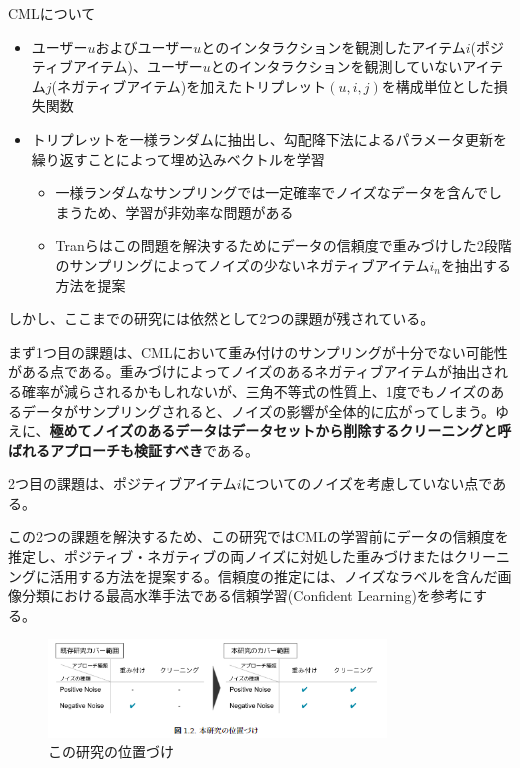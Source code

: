 \documentclass[11pt,a4paper]{article}
\begin{document}
CMLについて
\begin{itemize}
  \item ユーザー$u$およびユーザー$u$とのインタラクションを観測したアイテム$i$(ポジティブアイテム)、ユーザー$u$とのインタラクションを観測していないアイテム$j$(ネガティブアイテム)を加えたトリプレット$(u, i, j)$を構成単位とした損失関数
  \item トリプレットを一様ランダムに抽出し、勾配降下法によるパラメータ更新を繰り返すことによって埋め込みベクトルを学習
    \begin{itemize} 
      \item 一様ランダムなサンプリングでは一定確率でノイズなデータを含んでしまうため、学習が非効率な問題がある
      \item Tranらはこの問題を解決するためにデータの信頼度で重みづけした2段階のサンプリングによってノイズの少ないネガティブアイテム$i_n$を抽出する方法を提案
    \end{itemize}
\end{itemize}

しかし、ここまでの研究には依然として2つの課題が残されている。

まず1つ目の課題は、CMLにおいて重み付けのサンプリングが十分でない可能性がある点である。重みづけによってノイズのあるネガティブアイテムが抽出される確率が減らされるかもしれないが、三角不等式の性質上、1度でもノイズのあるデータがサンプリングされると、ノイズの影響が全体的に広がってしまう。ゆえに、\textbf{極めてノイズのあるデータはデータセットから削除するクリーニングと呼ばれるアプローチも検証すべき}である。

2つ目の課題は、ポジティブアイテム$i$についてのノイズを考慮していない点である。

この2つの課題を解決するため、この研究ではCMLの学習前にデータの信頼度を推定し、ポジティブ・ネガティブの両ノイズに対処した重みづけまたはクリーニングに活用する方法を提案する。信頼度の推定には、ノイズなラベルを含んだ画像分類における最高水準手法である信頼学習(Confident Learning)を参考にする。

\begin{figure}[h]
  \centering
  \includegraphics[width=0.8\textwidth]{本研究の位置づけ.png}
  \caption{この研究の位置づけ}
\end{figure}
\end{document}
